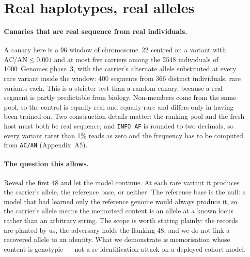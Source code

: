 \section{Real haplotypes, real alleles}
\label{sec:human}

\paragraph{Canaries that are real sequence from real individuals.}
A canary here is a 96\nt{} window of chromosome~22 centred on a variant with
$\mathrm{AC}/\mathrm{AN} \le 0.001$ and at most five carriers among the 2548 individuals of
1000~Genomes phase~3, with the carrier's alternate allele substituted at every rare variant inside
the window: 400 segments from 366 distinct individuals,  rare variants each. This is a
stricter test than a random canary, because a real segment is partly predictable from biology.
Non-members come from the same pool, so the control is equally real and equally rare and differs
only in having been trained on. Two construction details matter: the ranking pool and the fresh host
must both be real sequence, and \texttt{INFO AF} is rounded to two decimals, so every variant rarer
than 1\% reads as zero and the frequency has to be computed from \texttt{AC/AN} (Appendix~A5).

\paragraph{The question this allows.}
Reveal the first 48\nt{} and let the model continue. At each rare variant it produces the carrier's
allele, the reference base, or neither. The reference base is the null: a model that had learned
only the reference genome would always produce it, so the carrier's allele means the memorised
content is an allele at a known locus rather than an arbitrary string. The scope is worth stating
plainly: the records are planted by us, the adversary holds the flanking 48\nt, and we do not link a
recovered allele to an identity. What we demonstrate is memorisation whose content is genotypic ---
not a re-identification attack on a deployed cohort model.


